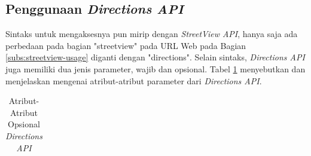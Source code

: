 \subsection{Penggunaan {\it Directions API}}
Sintaks untuk mengaksesnya pun mirip dengan \textit{StreetView API}, hanya saja ada perbedaan pada bagian "streetview" pada URL Web pada Bagian \ref{subs:streetview-usage} diganti dengan "directions". Selain sintaks, {\it Directions API} juga memiliki dua jenis parameter, wajib dan opsional. Tabel \ref{tab:atribut-directions-api} menyebutkan dan menjelaskan mengenai atribut-atribut parameter dari \textit{Directions API}.

\begin{table}[ht!]
	\centering
	\caption{Atribut-Atribut Opsional \textit{Directions API}}
	\label{tab:atribut-directions-api}
	\begin{tabular}{|p{3cm}|p{2.5cm}|p{2.5cm}|p{4cm}|p{3cm}|}


\end{tabular}
\end{table}
